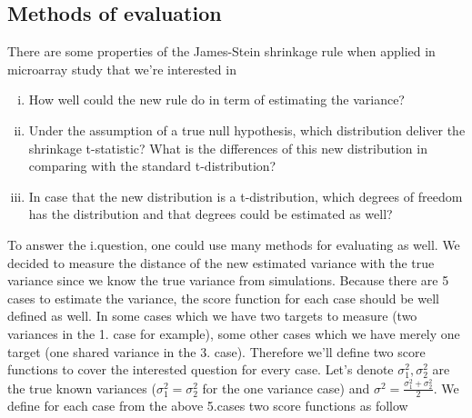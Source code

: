 \subsection{Methods of evaluation}
There are some properties of the James-Stein shrinkage rule when applied in microarray study that we're interested in
\begin{enumerate}[i.]
	\item How well could the new rule do in term of estimating the variance?
	\item Under the assumption of a true null hypothesis, which distribution deliver the shrinkage t-statistic? What is the differences of this new distribution in comparing with the standard t-distribution?
	\item In case that the new distribution is a t-distribution, which degrees of freedom has the distribution and that degrees could be estimated as well?
\end{enumerate}
To answer the i.question, one could use many methods for evaluating as well. We decided to measure the distance of the new estimated variance with the true variance since we know the true variance from simulations. Because there are 5 cases to estimate the variance, the score function for each case should be well defined as well. In some cases which we have two targets to measure (two variances in the 1. case for example), some other cases which we have merely one target (one shared variance in the 3. case). Therefore we'll define two score functions to cover the interested question for every case. Let's denote $\sigma_1^2, \sigma_2^2$ are the true known variances ($\sigma_1^2 = \sigma_2^2$ for the one variance case) and $\sigma^2 = \frac{\sigma_1^2 + \sigma_2^2}{2}$.  We define for each case from the above 5.cases two score functions as follow
